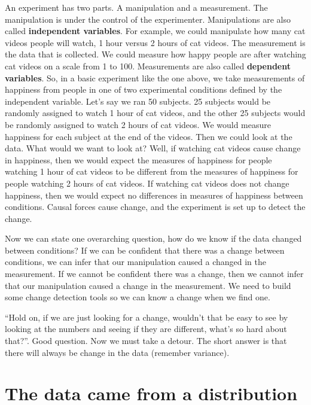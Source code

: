 \documentclass[]{book}
\begin{document}
An experiment has two parts. A manipulation and a measurement. The manipulation is under the control of the experimenter. Manipulations are also called \textbf{independent variables}. For example, we could manipulate how many cat videos people will watch, 1 hour versus 2 hours of cat videos. The measurement is the data that is collected. We could measure how happy people are after watching cat videos on a scale from 1 to 100. Measurements are also called \textbf{dependent variables}. So, in a basic experiment like the one above, we take measurements of happiness from people in one of two experimental conditions defined by the independent variable. Let's say we ran 50 subjects. 25 subjects would be randomly assigned to watch 1 hour of cat videos, and the other 25 subjects would be randomly assigned to watch 2 hours of cat videos. We would measure happiness for each subject at the end of the videos. Then we could look at the data. What would we want to look at? Well, if watching cat videos cause change in happiness, then we would expect the measures of happiness for people watching 1 hour of cat videos to be different from the measures of happiness for people watching 2 hours of cat videos. If watching cat videos does not change happiness, then we would expect no differences in measures of happiness between conditions. Causal forces cause change, and the experiment is set up to detect the change.

Now we can state one overarching question, how do we know if the data changed between conditions? If we can be confident that there was a change between conditions, we can infer that our manipulation caused a changed in the measurement. If we cannot be confident there was a change, then we cannot infer that our manipulation caused a change in the measurement. We need to build some change detection tools so we can know a change when we find one.

``Hold on, if we are just looking for a change, wouldn't that be easy to see by looking at the numbers and seeing if they are different, what's so hard about that?''. Good question. Now we must take a detour. The short answer is that there will always be change in the data (remember variance).

\hypertarget{the-data-came-from-a-distribution}{%
\section{The data came from a distribution}\label{the-data-came-from-a-distribution}}
\end{document}
